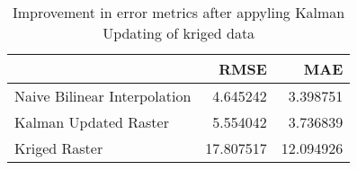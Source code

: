 \begin{table}
\caption{Improvement in error metrics after appyling Kalman Updating of kriged data}
\label{tab:oahu7_lidar_error}
\begin{tabular}{lrr}
\toprule
 & RMSE & MAE \\
\midrule
Naive Bilinear Interpolation & 4.645242 & 3.398751 \\
Kalman Updated Raster & 5.554042 & 3.736839 \\
Kriged Raster & 17.807517 & 12.094926 \\
\bottomrule
\end{tabular}
\end{table}
